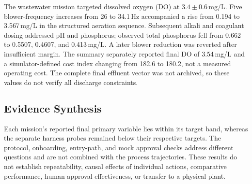 The wastewater mission targeted dissolved oxygen (DO) at $3.4\pm0.6$\,mg/L.
Five blower-frequency increases from 26 to 34.1\,Hz accompanied a rise from
0.194 to 3.567\,mg/L in the structured aeration sequence. Subsequent alkali
and coagulant dosing addressed pH and phosphorus; observed total phosphorus
fell from 0.662 to 0.5507, 0.4607, and 0.413\,mg/L. A later blower reduction
was reverted after insufficient margin. The summary separately reported final
DO of 3.54\,mg/L and a simulator-defined cost index changing from 182.6 to
180.2, not a measured operating cost. The complete final effluent vector was
not archived, so these values do not verify all discharge constraints.

\subsection{Evidence Synthesis}
Each mission's reported final primary variable lies within its target band,
whereas the separate harness probes remained below their respective targets.
The protocol, onboarding, entry-path, and mock approval checks address
different questions and are not combined with the process trajectories. These
results do not establish repeatability, causal effects of individual actions,
comparative performance, human-approval effectiveness, or transfer to a
physical plant.
